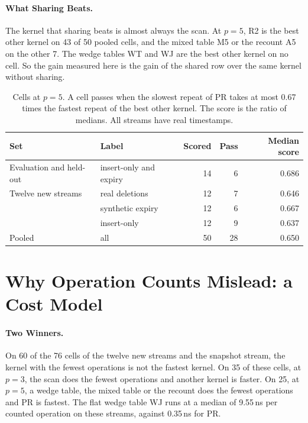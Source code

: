 \paragraph{What Sharing Beats.}
The kernel that sharing beats is almost always the scan.
At $p = 5$, R2 is the best other kernel on 43 of 50 pooled cells, and the mixed table M5 or the recount A5 on the other 7.
The wedge tables WT and WJ are the best other kernel on no cell.
So the gain measured here is the gain of the shared row over the same kernel without sharing.

\begin{table}[t]
  \centering
  \begin{tabular}{llrrr}
    \hline
    Set & Label & Scored & Pass & Median score \\
    \hline
    Evaluation and held-out & insert-only and expiry & 14 & 6 & 0.686 \\
    Twelve new streams & real deletions & 12 & 7 & 0.646 \\
                       & synthetic expiry & 12 & 6 & 0.667 \\
                       & insert-only & 12 & 9 & 0.637 \\
    Pooled & all & 50 & 28 & 0.650 \\
    \hline
  \end{tabular}
  \caption{Cells at $p = 5$. A cell passes when the slowest repeat of PR takes at most 0.67 times the fastest repeat of the best other kernel. The score is the ratio of medians. All streams have real timestamps.}
  \label{tab:p5}
\end{table}

\section{Why Operation Counts Mislead: a Cost Model}
\label{sec:costmodel}

\paragraph{Two Winners.}
On 60 of the 76 cells of the twelve new streams and the snapshot stream, the kernel with the fewest operations is not the fastest kernel.
On 35 of these cells, at $p = 3$, the scan does the fewest operations and another kernel is faster.
On 25, at $p = 5$, a wedge table, the mixed table or the recount does the fewest operations and PR is fastest.
The flat wedge table WJ runs at a median of 9.55\,ns per counted operation on these streams, against 0.35\,ns for PR.

